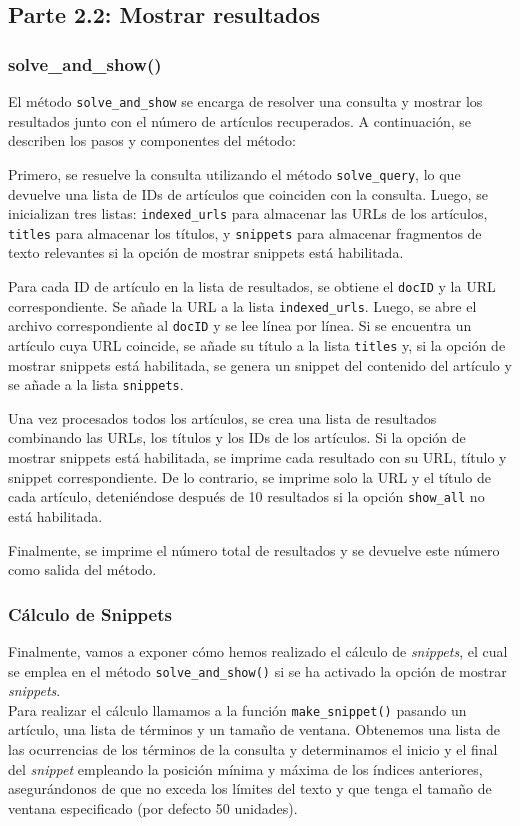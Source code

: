 \documentclass[12pt,a4paper]{article}
\begin{document}
\subsection{Parte 2.2: Mostrar resultados}
\subsubsection{solve\_and\_show()}
El método \texttt{solve\_and\_show} se encarga de resolver una consulta y mostrar los resultados junto con el número de artículos recuperados. A continuación, se describen los pasos y componentes del método:

Primero, se resuelve la consulta utilizando el método \texttt{solve\_query}, lo que devuelve una lista de IDs de artículos que coinciden con la consulta. Luego, se inicializan tres listas: \texttt{indexed\_urls} para almacenar las URLs de los artículos, \texttt{titles} para almacenar los títulos, y \texttt{snippets} para almacenar fragmentos de texto relevantes si la opción de mostrar snippets está habilitada.

Para cada ID de artículo en la lista de resultados, se obtiene el \texttt{docID} y la URL correspondiente. Se añade la URL a la lista \texttt{indexed\_urls}. Luego, se abre el archivo correspondiente al \texttt{docID} y se lee línea por línea. Si se encuentra un artículo cuya URL coincide, se añade su título a la lista \texttt{titles} y, si la opción de mostrar snippets está habilitada, se genera un snippet del contenido del artículo y se añade a la lista \texttt{snippets}.

Una vez procesados todos los artículos, se crea una lista de resultados combinando las URLs, los títulos y los IDs de los artículos. Si la opción de mostrar snippets está habilitada, se imprime cada resultado con su URL, título y snippet correspondiente. De lo contrario, se imprime solo la URL y el título de cada artículo, deteniéndose después de 10 resultados si la opción \texttt{show\_all} no está habilitada.

Finalmente, se imprime el número total de resultados y se devuelve este número como salida del método.

\subsubsection{Cálculo de Snippets}
Finalmente, vamos a exponer cómo hemos realizado el cálculo de \textit{snippets}, el cual se emplea en el método \texttt{solve\_and\_show()} si se ha activado la opción de mostrar \textit{snippets}.\\
Para realizar el cálculo llamamos a la función \texttt{make\_snippet()} pasando un artículo, una lista de términos y un tamaño de ventana. Obtenemos una lista de las ocurrencias de los términos de la consulta y determinamos el inicio y el final del \textit{snippet} empleando la posición mínima y máxima de los índices anteriores, asegurándonos de que no exceda los límites del texto y que tenga el tamaño de ventana especificado (por defecto 50 unidades).
\end{document}
